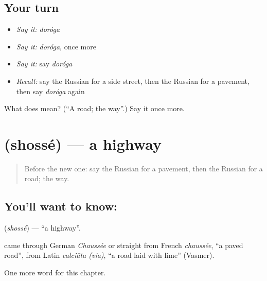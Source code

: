 \subsection*{Your turn}
\begin{itemize}
\raggedright
  \item \emph{Say it:} \emph{doróga}
  \item \emph{Say it:} \emph{doróga}, once more
  \item \emph{Say it:} say \emph{doróga}
  \item \emph{Recall:} say the Russian for a side street, then the Russian for a pavement, then say \emph{doróga} again
\end{itemize}

\begin{tcolorbox}[breakable,colback=teal!4,colframe=teal!35!black,title={Before you move on}]
What does  mean? (\textquotedblleft{}A road; the way\textquotedblright{}.) Say it once more.
\end{tcolorbox}
\section[\texorpdfstring{\ru{шоссе} (shossé)}{шоссе (shossé)}]{ (shossé) — a highway}

\label{lesson:RU-C183-shosse}



\begin{quote}
Before the new one: say the Russian for a pavement, then the Russian for a road; the way.
\end{quote}

\subsection*{You'll want to know: }
\textbf{} (\emph{shossé}) — \textquotedblleft{}a highway\textquotedblright{}.

\begin{cousinweb}
\textbf{} came through German \emph{Chaussée} or straight from French \emph{chaussée}, \textquotedblleft{}a paved road\textquotedblright{}, from Latin \emph{calciāta (via)}, \textquotedblleft{}a road laid with lime\textquotedblright{} (Vasmer).
\end{cousinweb}

\begin{grammarlens}[title={What you've built}]
One more word for this chapter.
\end{grammarlens}


